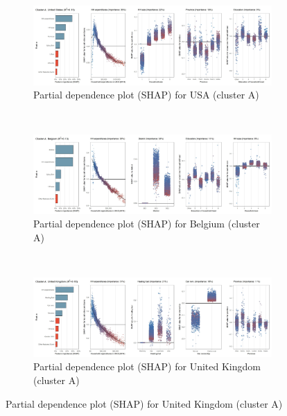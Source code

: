\begin{figure}[ht!]\ContinuedFloat
    \centering
   \begin{subfigure}[b]{\textwidth}
         \centering
         \caption{Partial dependence plot (SHAP) for USA (cluster A)}
         \label{fig:5b_USA}
         \includegraphics[width=\textwidth]{Figure 5b/Figure_5b_USA}         
     \end{subfigure}
    \\
    \vspace{0.5cm}
   \begin{subfigure}[b]{\textwidth}
         \centering
         \caption{Partial dependence plot (SHAP) for Belgium (cluster A)}
         \label{fig:5b_BEL}
         \includegraphics[width=\textwidth]{Figure 5b/Figure_5b_BEL}         
     \end{subfigure}
    \\
    \vspace{0.5cm}
   \begin{subfigure}[b]{\textwidth}
         \centering
         \caption{Partial dependence plot (SHAP) for United Kingdom (cluster A)}
         \label{fig:5b_GBR}
         \includegraphics[width=\textwidth]{Figure 5b/Figure_5b_GBR}

\end{subfigure}
\end{figure}
